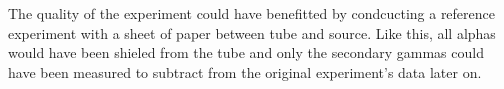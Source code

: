 The quality of the experiment could have benefitted by condcucting a reference experiment with a sheet of paper between tube and source.
Like this, all alphas would have been shieled from the tube and only the secondary gammas could have been measured to subtract from the original experiment's data later on.
